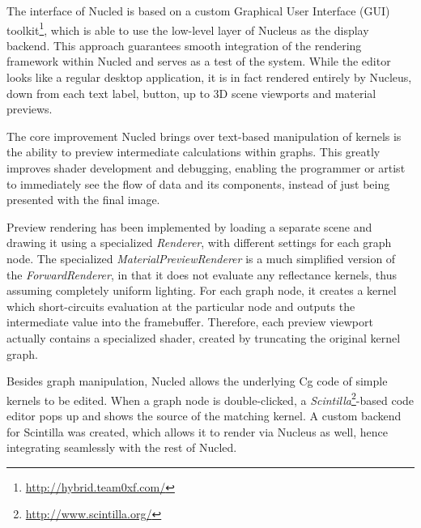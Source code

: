 The interface of Nucled is based on a custom Graphical User Interface (GUI) toolkit\footnote{\url{http://hybrid.team0xf.com/}}, which is able to use the low-level layer of Nucleus as the display backend. This approach guarantees smooth integration of the rendering framework within Nucled and serves as a test of the system. While the editor looks like a regular desktop application, it is in fact rendered entirely by Nucleus, down from each text label, button, up to 3D scene viewports and material previews.

The core improvement Nucled brings over text-based manipulation of kernels is the ability to preview intermediate calculations within graphs. This greatly improves shader development and debugging, enabling the programmer or artist to immediately see the flow of data and its components, instead of just being presented with the final image.

Preview rendering has been implemented by loading a separate scene and drawing it using a specialized \emph{Renderer}, with different settings for each graph node. The specialized \emph{MaterialPreviewRenderer} is a much simplified version of the \emph{ForwardRenderer}, in that it does not evaluate any reflectance kernels, thus assuming completely uniform lighting. For each graph node, it creates a kernel which short-circuits evaluation at the particular node and outputs the intermediate value into the framebuffer. Therefore, each preview viewport actually contains a specialized shader, created by truncating the original kernel graph.

Besides graph manipulation, Nucled allows the underlying Cg code of simple kernels to be edited. When a graph node is double-clicked, a \emph{Scintilla}\footnote{\url{http://www.scintilla.org/}}-based code editor pops up and shows the source of the matching kernel. A custom backend for Scintilla was created, which allows it to render via Nucleus as well, hence integrating seamlessly with the rest of Nucled.



